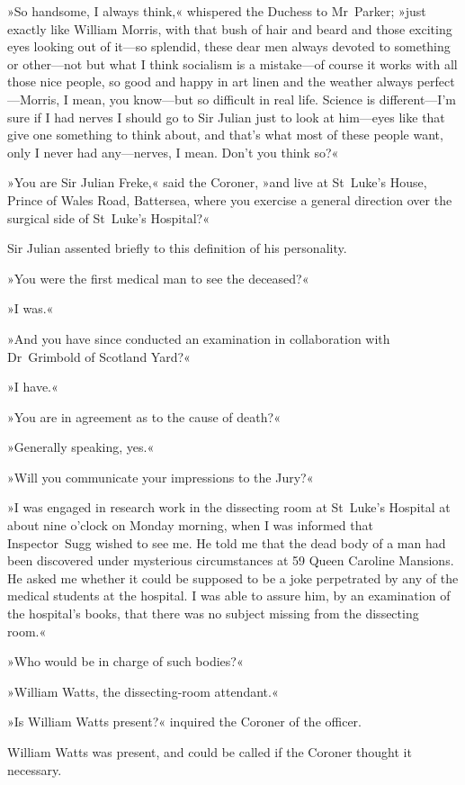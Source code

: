 »So handsome, I always think,« whispered the Duchess to Mr~Parker; »just exactly like William Morris, with that bush of hair and beard and those exciting eyes looking out of it—so splendid, these dear men always devoted to something or other—not but what I think socialism is a mistake—of course it works with all those nice people, so good and happy in art linen and the weather always perfect—Morris, I mean, you know—but so difficult in real life. Science is different—I'm sure if I had nerves I should go to Sir Julian just to look at him—eyes like that give one something to think about, and that's what most of these people want, only I never had any—nerves, I mean. Don't you think so?«

»You are Sir Julian Freke,« said the Coroner, »and live at St~Luke's House, Prince of Wales Road, Battersea, where you exercise a general direction over the surgical side of St~Luke's Hospital?«

Sir Julian assented briefly to this definition of his personality.

»You were the first medical man to see the deceased?«

»I was.«

»And you have since conducted an examination in collaboration with Dr~Grimbold of Scotland Yard?«

»I have.«

»You are in agreement as to the cause of death?«

»Generally speaking, yes.«

»Will you communicate your impressions to the Jury?«

»I was engaged in research work in the dissecting room at St~Luke's Hospital at about nine o'clock on Monday morning, when I was informed that Inspector~Sugg wished to see me. He told me that the dead body of a man had been discovered under mysterious circumstances at 59 Queen Caroline Mansions. He asked me whether it could be supposed to be a joke perpetrated by any of the medical students at the hospital. I was able to assure him, by an examination of the hospital's books, that there was no subject missing from the dissecting room.«

»Who would be in charge of such bodies?«

»William Watts, the dissecting-room attendant.«

»Is William Watts present?« inquired the Coroner of the officer.

William Watts was present, and could be called if the Coroner thought it necessary.

